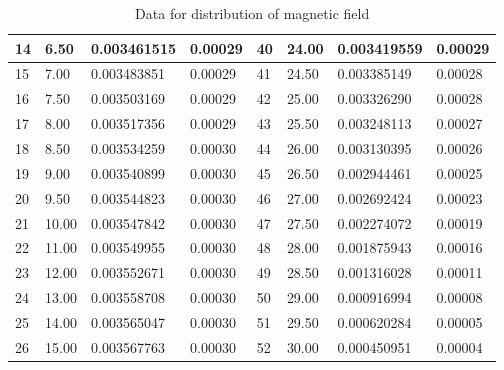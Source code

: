 \documentclass[12pt, a4paper]{article}
\begin{document}
\begin{table}[H]
\begin{center}
\begin{tabular}{|l|l|l|l|l|l|l|l|}
	14 & 6.50                          & 0.003461515 & 0.00029      & 40 & 24.00                         & 0.003419559 & 0.00029      \\ \hline
	15 & 7.00                          & 0.003483851 & 0.00029      & 41 & 24.50                         & 0.003385149 & 0.00028      \\ \hline
	16 & 7.50                          & 0.003503169 & 0.00029      & 42 & 25.00                         & 0.003326290 & 0.00028      \\ \hline
	17 & 8.00                          & 0.003517356 & 0.00029      & 43 & 25.50                         & 0.003248113 & 0.00027      \\ \hline
	18 & 8.50                          & 0.003534259 & 0.00030      & 44 & 26.00                         & 0.003130395 & 0.00026      \\ \hline
	19 & 9.00                          & 0.003540899 & 0.00030      & 45 & 26.50                         & 0.002944461 & 0.00025      \\ \hline
	20 & 9.50                          & 0.003544823 & 0.00030      & 46 & 27.00                         & 0.002692424 & 0.00023      \\ \hline
	21 & 10.00                         & 0.003547842 & 0.00030      & 47 & 27.50                         & 0.002274072 & 0.00019      \\ \hline
	22 & 11.00                         & 0.003549955 & 0.00030      & 48 & 28.00                         & 0.001875943 & 0.00016      \\ \hline
	23 & 12.00                         & 0.003552671 & 0.00030      & 49 & 28.50                         & 0.001316028 & 0.00011      \\ \hline
	24 & 13.00                         & 0.003558708 & 0.00030      & 50 & 29.00                         & 0.000916994 & 0.00008      \\ \hline
	25 & 14.00                         & 0.003565047 & 0.00030      & 51 & 29.50                         & 0.000620284 & 0.00005      \\ \hline
	26 & 15.00                         & 0.003567763 & 0.00030      & 52 & 30.00                         & 0.000450951 & 0.00004      \\ \hline
	\end{tabular}
	\caption{Data for distribution of magnetic field}		
	\end{center}
\end{table}
\end{document}
